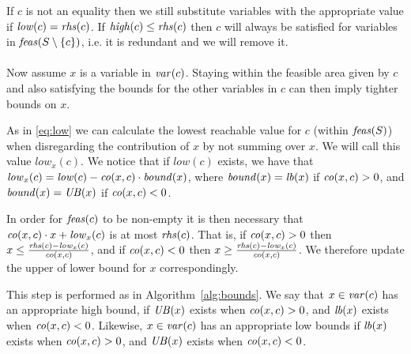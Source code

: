 If $c$ is not an equality then we still substitute variables with the appropriate value if $\mathit{low}(c) = \mathit{rhs}(c)$.  %
If $\mathit{high}(c)\leq\mathit{rhs}(c)$ then $c$ will always be satisfied for variables in $\mathit{feas}(S\setminus\{c\})$, i.e. it is redundant and we will remove it. 
\\\\
Now assume $x$ is a variable in $\mathit{var}(c)$. 
{Staying within the feasible area given by $c$ and also satisfying the bounds for the other variables in $c$ can then imply tighter bounds on $x$.}

As in \eqref{eq:low} we can calculate the lowest reachable value for $c$ (within $\mathit{feas}(S)$) when disregarding the contribution of $x$ by not summing over $x$. We will call this value $\mathit{low}_x(c)$. We notice that if $\mathit{low}(c)$ exists, we have that $\mathit{low}_x(c) = \mathit{low}(c) - \mathit{co}(x,c)\cdot \mathit{bound}(x)$, where $\mathit{bound}(x)=\mathit{lb}(x)$ if $\mathit{co}(x,c)>0$, and $\mathit{bound}(x)= \mathit{UB}(x)$ if $\mathit{co}(x,c)<0$.

In order for $\mathit{feas}(c)$ to be non-empty it is then necessary that 
	$\mathit{co}(x,c)\cdot x + \mathit{low}_x(c)$ is at most $\mathit{rhs}(c)$. 	
That is, if $\mathit{co}(x,c)>0$ then $x\leq \frac{\mathit{rhs}(c)-\mathit{low}_x(c)}{\mathit{co}(x,c)}$, and if $\mathit{co}(x,c)<0$ then $x\geq \frac{\mathit{rhs}(c)-\mathit{low}_x(c)}{\mathit{co}(x,c)}$. We therefore update the upper of lower bound for $x$ correspondingly.
	

This step is performed as in Algorithm~\ref{alg:bounds}. 
We say that $x\in\mathit{var}(c)$ has an appropriate high bound, if $\mathit{UB}(x)$ exists when $\mathit{co}(x,c)>0$, and $\mathit{lb}(x)$ exists when $\mathit{co}(x,c)<0$. Likewise, $x\in\mathit{var}(c)$ has an appropriate low bounds if $\mathit{lb}(x)$ exists when $\mathit{co}(x,c)>0$, and $\mathit{UB}(x)$ exists when $\mathit{co}(x,c)<0$.

